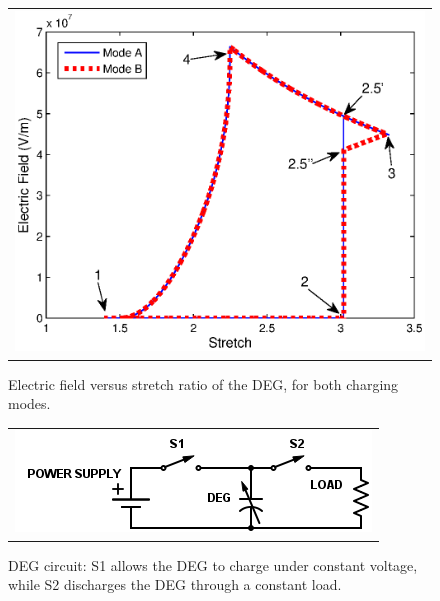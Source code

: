 \begin{figure}
   \begin{center}
   \begin{tabular}{c} %
   \includegraphics[scale=0.8]{fig02/Fig1.eps}
   \end{tabular}
   \end{center}
   \caption[example] 
   { \label{fig:Cycle SxE} 
Electric field versus stretch ratio of the DEG, for both charging modes.}
\end{figure}


   \begin{figure}[h]
   \begin{center}
   \begin{tabular}{c} %
   \includegraphics[scale=1.0]{fig02/circuit.png}
   \end{tabular}
   \end{center}
   \caption[example] 
   { \label{fig:circuit} 
DEG circuit: S1 allows the DEG to charge under constant voltage, while S2 discharges the DEG through a constant load.}
   \end{figure} 
 

